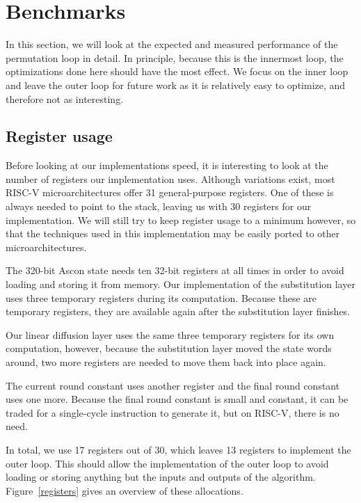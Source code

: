 \section{Benchmarks}

In this section, we will look at the expected and measured performance of the
permutation loop in detail. In principle, because this is the innermost loop,
the optimizations done here should have the most effect. We focus on the inner
loop and leave the outer loop for future work as it is relatively easy to
optimize, and therefore not as interesting.

\subsection{Register usage}

Before looking at our implementations speed, it is interesting to look at the
number of registers our implementation uses. Although variations exist, most
RISC-V microarchitectures offer 31 general-purpose registers. One of these is
always needed to point to the stack, leaving us with 30 registers for our
implementation. We will still try to keep register usage to a minimum however,
so that the techniques used in this implementation may be easily ported to other
microarchitectures.

The 320-bit Ascon state needs ten 32-bit registers at all times in order to
avoid loading and storing it from memory. Our implementation of the substitution
layer uses three temporary registers during its computation. Because these are
temporary registers, they are available again after the substitution layer
finishes.

Our linear diffusion layer uses the same three temporary registers for its own
computation, however, because the substitution layer moved the state words
around, two more registers are needed to move them back into place again.

The current round constant uses another register and the final round constant
uses one more. Because the final round constant is small and constant, it can be
traded for a single-cycle instruction to generate it, but on RISC-V, there is no
need.

In total, we use 17 registers out of 30, which leaves 13 registers to implement
the outer loop. This should allow the implementation of the outer loop to avoid
loading or storing anything but the inputs and outputs of the algorithm.
Figure~\ref{registers} gives an overview of these allocations.

